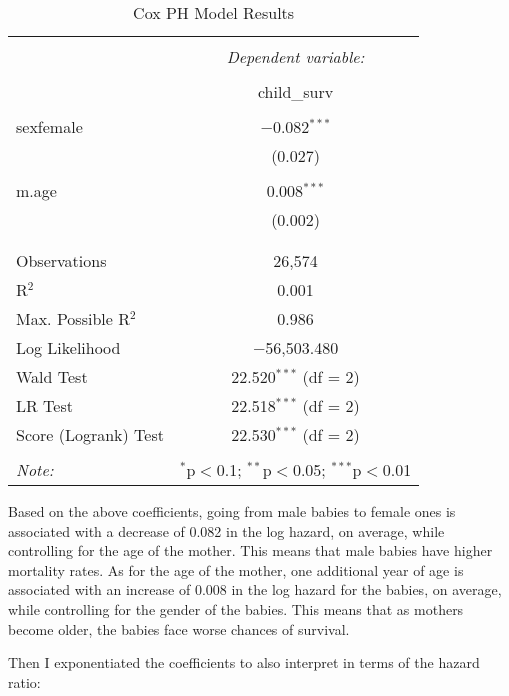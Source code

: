 \documentclass[12pt,letterpaper]{article}
\begin{document}
\begin{table}[H] \centering   \caption{Cox PH Model Results}   \label{} \begin{tabular}{@{\extracolsep{5pt}}lc} \\[-1.8ex]\hline \hline \\[-1.8ex]  & \multicolumn{1}{c}{\textit{Dependent variable:}} \\ \cline{2-2} \\[-1.8ex] & child\_surv \\ \hline \\[-1.8ex]  sexfemale & $-$0.082$^{***}$ \\   & (0.027) \\   & \\  m.age & 0.008$^{***}$ \\   & (0.002) \\   & \\ \hline \\[-1.8ex] Observations & 26,574 \\ R$^{2}$ & 0.001 \\ Max. Possible R$^{2}$ & 0.986 \\ Log Likelihood & $-$56,503.480 \\ Wald Test & 22.520$^{***}$ (df = 2) \\ LR Test & 22.518$^{***}$ (df = 2) \\ Score (Logrank) Test & 22.530$^{***}$ (df = 2) \\ \hline \hline \\[-1.8ex] \textit{Note:}  & \multicolumn{1}{r}{$^{*}$p$<$0.1; $^{**}$p$<$0.05; $^{***}$p$<$0.01} \\ \end{tabular} \end{table} 

\noindent Based on the above coefficients, going from male babies to female ones is associated with a decrease of 0.082 in the log hazard, on average, while controlling for the age of the mother. This means that male babies have higher mortality rates. As for the age of the mother, one additional year of age is associated with an increase of 0.008 in the log hazard for the babies, on average, while controlling for the gender of the babies. This means that as mothers become older, the babies face worse chances of survival. 

\vspace{0.25cm}
\noindent Then I exponentiated the coefficients to also interpret in terms of the hazard ratio: 
\end{document}
